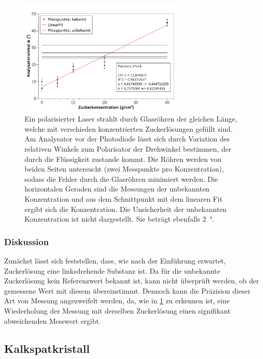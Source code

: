 \documentclass[
	a4paper,
	12pt,
	pagesize,
	ngerman
]{scrartcl}
\begin{document}
	\begin{figure}[H]
		\includegraphics[width=0.7\textwidth]{fig_Zucker}
		\centering
		\caption{Ein polarisierter Laser strahlt durch Glasröhren der gleichen Länge, welche mit verschieden konzentrierten Zuckerlösungen gefüllt sind. 
		Am Analysator vor der Photodiode lässt sich durch Variation des relativen Winkels zum Polarisator der Drehwinkel bestimmen, der durch die Flüssigkeit zustande kommt.
		Die Röhren werden von beiden Seiten untersucht (zwei Messpunkte pro Konzentration), sodass die Fehler durch die Glasröhren minimiert werden.
		Die horizontalen Geraden sind die Messungen der unbekannten Konzentration und aus dem Schnittpunkt mit dem linearen Fit ergibt sich die Konzentration.
		Die Unsicherheit der unbekannten Konzentration ist nicht dargestellt. Sie beträgt ebenfalls \SI{2}{\degree}.
		}
		\label{fig_zucker}
		\centering
	\end{figure}

	\subsubsection{Diskussion}
	Zunächst lässt sich feststellen, dass, wie nach der Einführung erwartet, Zuckerlösung eine linksdrehende Substanz ist.
	Da für die unbekannte Zuckerlösung kein Referenzwert bekannt ist, kann nicht überprüft werden, ob der gemessene Wert mit diesem übereinstimmt.
	Dennoch kann die Präzision dieser Art von Messung angezweifelt werden, da, wie in \cref{fig_zucker} zu erkennen ist, eine Wiederholung der Messung mit derselben Zuckerlösung einen signifikant abweichenden Messwert ergibt.
	
	\subsection{Kalkspatkristall}
\end{document}
